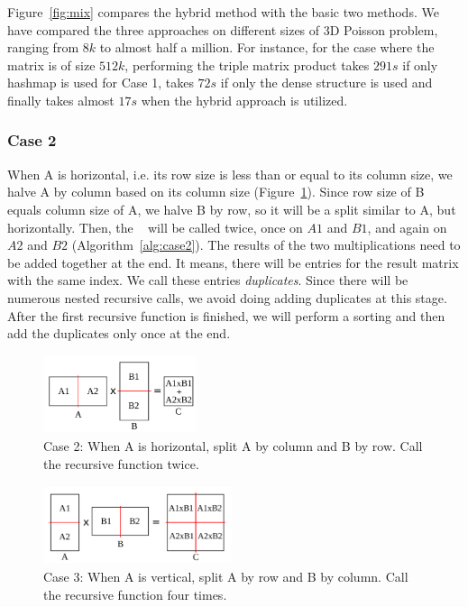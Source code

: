 Figure~\ref{fig:mix} compares the hybrid method with the basic two methods. We have compared the three approaches on different sizes of 3D Poisson problem, ranging from $8k$ to almost half a million. For instance, for the case where the matrix is of size $512k$, performing the triple matrix product takes $291s$ if only hashmap is used for Case 1, takes $72s$ if only the dense structure is used and finally takes almost $17s$ when the hybrid approach is utilized.


\subsubsection{Case 2}
\label{sec:case2}
When A is horizontal, i.e. its row size is less than or equal to its column size, we halve A by column based on its column size (Figure~\ref{fig:case2_left}). Since row size of B equals column size of A, we halve B by row, so it will be a split similar to A, but horizontally.
Then, the \recmm~ will be called twice, once on $A1$ and $B1$, and again on $A2$ and $B2$ (Algorithm~\ref{alg:case2}). The results of the two multiplications need to be added together at the end. It means, there will be entries for the result matrix with the same index. We call these entries \textit{duplicates}. Since there will be numerous nested recursive calls, we avoid doing adding duplicates at this stage. After the first recursive function is finished, we will perform a sorting and then add the duplicates only once at the end.

\begin{figure}[tbh]
    \centering
    \includegraphics[width=4.5cm,height=2.3cm]{./figures/case2_001.pdf}
    \caption{Case 2: When A is horizontal, split A by column and B by row. Call the recursive function twice.}
    \label{fig:case2_left}
    \Description{}
\end{figure}

\begin{figure}[tbh]
    \centering
    \includegraphics[width=5.5cm,height=2.3cm]{./figures/case3_001.pdf}
    \caption{Case 3: When A is vertical, split A by row and B by column. Call the recursive function four times.}
    \label{fig:case3}
    \Description{}
\end{figure}

